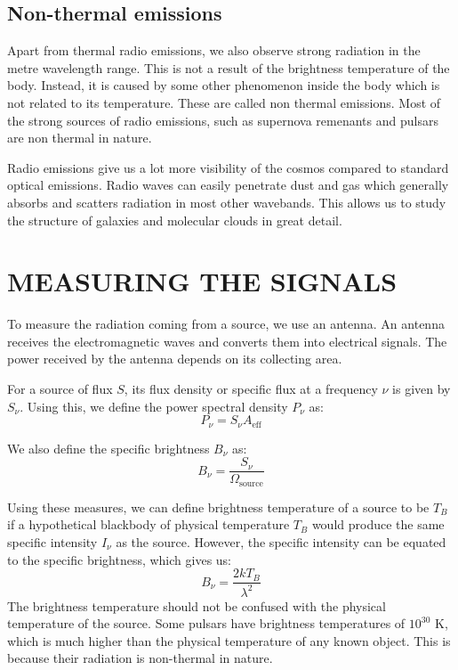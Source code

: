 \documentclass{article_saj}
\begin{document}
\subsection{Non-thermal emissions}
Apart from thermal radio emissions, we also observe strong radiation in the metre wavelength range. This is not a result of the brightness temperature of the body. Instead, it is caused by some other phenomenon inside the body which is not related to its temperature. These are called non thermal emissions. Most of the strong sources of radio emissions, such as supernova remenants and pulsars are non thermal in nature. 

Radio emissions give us a lot more visibility of the cosmos compared to standard optical emissions. Radio waves can easily penetrate dust and gas which generally absorbs and scatters radiation in most other wavebands. This allows us to study the structure of galaxies and molecular clouds in great detail.


\section{MEASURING THE SIGNALS}
To measure the radiation coming from a source, we use an antenna. An antenna receives the electromagnetic waves and converts them into electrical signals. The power received by the antenna depends on its collecting area. 

For a source of flux $S$, its flux density or specific flux at a frequency $\nu$ is given by $S_{\nu}$. Using this, we define the power spectral density $P_{\nu}$ as:
\begin{equation}
  P_{\nu} = S_{\nu}A_{\text{eff}}
\end{equation}

We also define the specific brightness $B_{\nu}$ as:
\begin{equation}
  B_{\nu} = \frac{S_{\nu}}{\Omega_{\text{source}}}
\end{equation}

Using these measures, we can define brightness temperature of a source to be $T_B$ if a hypothetical blackbody of physical temperature $T_B$ would produce the same specific intensity $I_{\nu}$ as the source. However, the specific intensity can be equated to the specific brightness, which gives us:
\begin{equation}
  B_{\nu} = \frac{2 kT_B}{\lambda^2}
\end{equation}
The brightness temperature should not be confused with the physical temperature of the source. Some pulsars have brightness temperatures of $10^{30}$ K, which is much higher than the physical temperature of any known object. This is because their radiation is non-thermal in nature.
\end{document}

